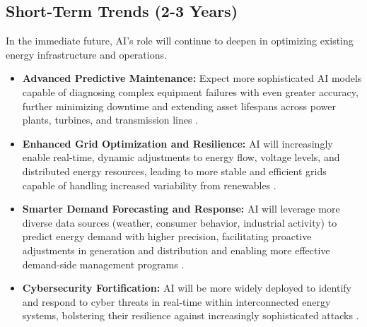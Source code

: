 \subsection{Short-Term Trends (2-3 Years)}
In the immediate future, AI's role will continue to deepen in optimizing existing energy infrastructure and operations.
\begin{itemize}
    \item \textbf{Advanced Predictive Maintenance:} Expect more sophisticated AI models capable of diagnosing complex equipment failures with even greater accuracy, further minimizing downtime and extending asset lifespans across power plants, turbines, and transmission lines \cite{EdgeAIHub_FutureTrends, GCPIT_FutureTrends}.
    \item \textbf{Enhanced Grid Optimization and Resilience:} AI will increasingly enable real-time, dynamic adjustments to energy flow, voltage levels, and distributed energy resources, leading to more stable and efficient grids capable of handling increased variability from renewables \cite{GCPIT_FutureTrends, Exatonix_FutureTrends}.
    \item \textbf{Smarter Demand Forecasting and Response:} AI will leverage more diverse data sources (weather, consumer behavior, industrial activity) to predict energy demand with higher precision, facilitating proactive adjustments in generation and distribution and enabling more effective demand-side management programs \cite{GCPIT_FutureTrends, Exatonix_FutureTrends}.
    \item \textbf{Cybersecurity Fortification:} AI will be more widely deployed to identify and respond to cyber threats in real-time within interconnected energy systems, bolstering their resilience against increasingly sophisticated attacks \cite{GCPIT_FutureTrends}.
\end{itemize}


